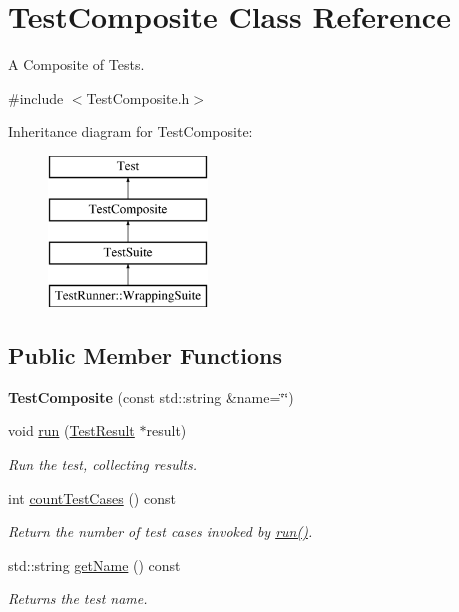 \hypertarget{class_test_composite}{}\section{Test\+Composite Class Reference}
\label{class_test_composite}


A Composite of Tests.  




{\ttfamily \#include $<$Test\+Composite.\+h$>$}

Inheritance diagram for Test\+Composite\+:\begin{figure}[H]
\begin{center}
\leavevmode
\includegraphics[height=4.000000cm]{class_test_composite}
\end{center}
\end{figure}
\subsection*{Public Member Functions}
\begin{DoxyCompactItemize}
\item 
{\bfseries Test\+Composite} (const std\+::string \&name=\char`\"{}\char`\"{})\hypertarget{class_test_composite_aa82b05d6ca806b023beba504ec9b1d41}{}\label{class_test_composite_aa82b05d6ca806b023beba504ec9b1d41}

\item 
void \hyperlink{class_test_composite_a2ba14045b1a1e83963dd4db746b04dfd}{run} (\hyperlink{class_test_result}{Test\+Result} $\ast$result)\hypertarget{class_test_composite_a2ba14045b1a1e83963dd4db746b04dfd}{}\label{class_test_composite_a2ba14045b1a1e83963dd4db746b04dfd}

\begin{DoxyCompactList}\small\item\em Run the test, collecting results. \end{DoxyCompactList}\item 
int \hyperlink{class_test_composite_aab3a79f9629eb6f026467e9c27b08788}{count\+Test\+Cases} () const 
\begin{DoxyCompactList}\small\item\em Return the number of test cases invoked by \hyperlink{class_test_composite_a2ba14045b1a1e83963dd4db746b04dfd}{run()}. \end{DoxyCompactList}\item 
std\+::string \hyperlink{class_test_composite_addf2aec7ab7233e433cb5bdf98defb61}{get\+Name} () const 
\begin{DoxyCompactList}\small\item\em Returns the test name. \end{DoxyCompactList}\end{DoxyCompactItemize}
